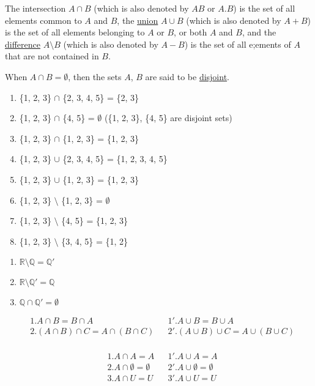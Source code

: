 \documentclass[11pt]{amsbook}
\begin{document}




The intersection \(A \cap B\) (which is also denoted by $AB$ or $A.B$) is the set of all elements common to $A$ and $B$, the \underline{union}  \(A \cup B\) (which is also denoted by $A + B$) is the set of all elements belonging to $A$ or $B$, or both $A$ and $B$, and the \underline{difference} $A \setminus B$ (which is also denoted by $A - B$) is the set of all e;ements of $A$ that are not contained in $B$.

When \( A \cap B = \emptyset \), then the sets $A$, $B$ are said to be \underline{disjoint}.

\begin{exmp}


\begin{enumerate}[label={\arabic*.}]

  \item \{1, 2, 3\} $\cap$ \{2, 3, 4, 5\} = \{2, 3\}
  \item  \{1, 2, 3\} $\cap$ \{4, 5\} = $\emptyset$ \quad (\{1, 2, 3\}, \{4, 5\} are disjoint sets)
  \item  \{1, 2, 3\} $\cap$ \{1, 2, 3\} = \{1, 2, 3\}
  \item  \{1, 2, 3\} $\cup$ \{2, 3, 4, 5\} = \{1, 2, 3, 4, 5\}
  \item  \{1, 2, 3\} $\cup$ \{1, 2, 3\} = \{1, 2, 3\}
  \item  \{1, 2, 3\} $\setminus$ \{1, 2, 3\} = $\emptyset$
  \item  \{1, 2, 3\} $\setminus$ \{4, 5\} = \{1, 2, 3\}
  \item  \{1, 2, 3\} $\setminus$ \{3, 4, 5\} = \{1, 2\}
  
\end{enumerate}
\end{exmp}
\begin{exmp} 
\begin{enumerate}[label={\arabic*.}] 
\item \(\mathbb{R} \setminus \mathbb{Q}  = \mathbb{Q}' \)  
\item \(\mathbb{R} \setminus \mathbb{Q}' = \mathbb{Q}  \) 
\item \( \mathbb{Q} \cap \mathbb{Q}' = \emptyset  \) 
\end{enumerate}
\end{exmp}

\begin{cor} 
\begin{align*}
&1.	A \cap B = B \cap A   &  &1'.	A \cup B = B \cup A \\
&2. (A \cap B) \cap C = A \cap (B \cap C)    &   &2'.	(A \cup B) \cup C = A \cup (B \cup C) \\
\end{align*}
\end{cor}

\begin{cor}
\begin{align*}
&1.	A \cap A = A   &  &1'.	A \cup A = A\\
&2. A \cap \emptyset  = \emptyset  &   &2'.	A \cup \emptyset  = \emptyset \\
&3. A \cap U  = U  &   &3'.	A \cup U  = U \\
\end{align*}
\end{cor}
\end{document}
